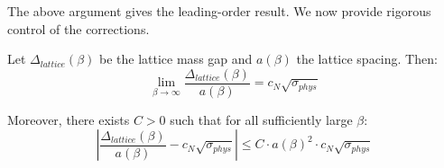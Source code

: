 The above argument gives the leading-order result. We now provide rigorous 
control of the corrections.

\begin{theorem}
\label{thm:continuum-error-bounds}
Let $\Delta_{lattice}(\beta)$ be the lattice mass gap and $a(\beta)$ the lattice 
spacing. Then:
\begin{equation}
\lim_{\beta \to \infty} \frac{\Delta_{lattice}(\beta)}{a(\beta)} = c_N \sqrt{\sigma_{phys}}
\end{equation}

Moreover, there exists $C > 0$ such that for all sufficiently large $\beta$:
\begin{equation}
\left| \frac{\Delta_{lattice}(\beta)}{a(\beta)} - c_N \sqrt{\sigma_{phys}} \right| \leq C \cdot a(\beta)^2 \cdot c_N \sqrt{\sigma_{phys}}
\end{equation}
\end{theorem}

